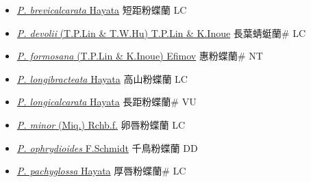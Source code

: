 \begin{itemize}
  \begin{itemize}
        \item[] \href{http://www.theplantlist.org/tpl1.1/search?q=Platanthera+brevicalcarata}{\textit{P. brevicalcarata} Hayata}   短距粉蝶蘭 LC
        \item[] \href{http://www.theplantlist.org/tpl1.1/search?q=Platanthera+devolii}{\textit{P. devolii} (T.P.Lin \& T.W.Hu) T.P.Lin \& K.Inoue}     長葉蜻蜓蘭\# LC
        \item[] \href{http://www.theplantlist.org/tpl1.1/search?q=Platanthera+formosana}{\textit{P. formosana} (T.P.Lin \& K.Inoue) Efimov}     惠粉蝶蘭\# NT
        \item[] \href{http://www.theplantlist.org/tpl1.1/search?q=Platanthera+longibracteata}{\textit{P. longibracteata} Hayata}     高山粉蝶蘭 LC
        \item[] \href{http://www.theplantlist.org/tpl1.1/search?q=Platanthera+longicalcarata}{\textit{P. longicalcarata} Hayata}   長距粉蝶蘭\# VU
        \item[] \href{http://www.theplantlist.org/tpl1.1/search?q=Platanthera+minor}{\textit{P. minor} (Miq.) Rchb.f.}   卵唇粉蝶蘭 LC
        \item[] \href{http://www.theplantlist.org/tpl1.1/search?q=Platanthera+ophrydioides}{\textit{P. ophrydioides} F.Schmidt}   千鳥粉蝶蘭 DD
        \item[] \href{http://www.theplantlist.org/tpl1.1/search?q=Platanthera+pachyglossa}{\textit{P. pachyglossa} Hayata}     厚唇粉蝶蘭\# LC

\end{itemize}
\end{itemize}
